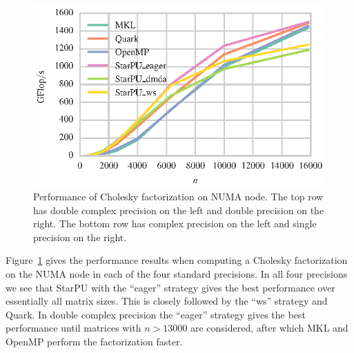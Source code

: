 \documentclass[a4paper,12pt]{article}
\begin{document}
\begin{figure}[t]
  \includegraphics[scale=.85]{fig/kebnekaise_spotrf_weak_scaling.eps}
  \caption{Performance of Cholesky factorization on NUMA node.
    The top row has double complex precision on the left and double
    precision on the right.
    The bottom row has complex precision on the left and single
    precision on the right.}
  \label{fig.chol_numa}
\end{figure}

Figure~\ref{fig.chol_numa} gives the performance results
when computing a Cholesky factorization on the NUMA node
in each of the four standard precisions.
In all four precisions we see that StarPU with
the ``eager'' strategy gives the best performance over
essentially all matrix sizes.
This is closely followed by the ``ws'' strategy
and Quark.
In double complex precision the ``eager'' strategy
gives the best performance until matrices with
$n > 13000$ are considered,
after which MKL and OpenMP perform the factorization faster.
\end{document}
